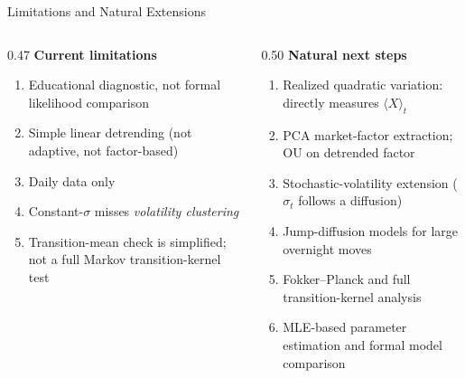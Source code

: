 \documentclass[aspectratio=169,10pt]{beamer}
\begin{document}
\begin{frame}{Limitations and Natural Extensions}

\begin{columns}[T]
\begin{column}{0.47\textwidth}
\textbf{Current limitations}
\begin{enumerate}\setlength{\itemsep}{3pt}\small
  \item Educational diagnostic, not formal likelihood comparison
  \item Simple linear detrending (not adaptive, not factor-based)
  \item Daily data only
  \item Constant-$\sigma$ misses \emph{volatility clustering}
  \item Transition-mean check is simplified; not a full Markov transition-kernel test
\end{enumerate}
\end{column}
\begin{column}{0.50\textwidth}
\textbf{Natural next steps}
\begin{enumerate}\setlength{\itemsep}{3pt}\small
  \item Realized quadratic variation: directly measures $\langle X\rangle_t$
  \item PCA market-factor extraction; OU on detrended factor
  \item Stochastic-volatility extension ($\sigma_t$ follows a diffusion)
  \item Jump-diffusion models for large overnight moves
  \item Fokker--Planck and full transition-kernel analysis
  \item MLE-based parameter estimation and formal model comparison
\end{enumerate}
\end{column}
\end{columns}

\end{frame}
\end{document}
